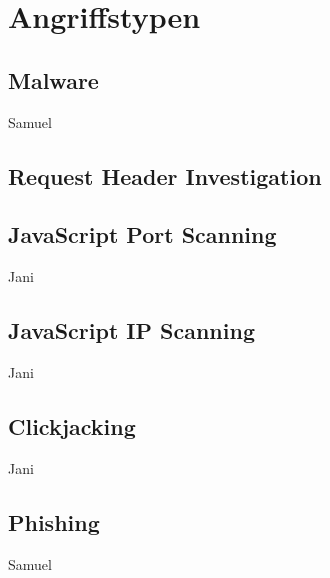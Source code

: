 \section{Angriffstypen}

\subsection{Malware}

\todo Samuel

\subsection{Request Header Investigation}


\subsection{JavaScript Port Scanning}

\todo Jani

\subsection{JavaScript IP Scanning}

\todo Jani

\subsection{Clickjacking}

\todo Jani

\subsection{Phishing}

\todo Samuel
